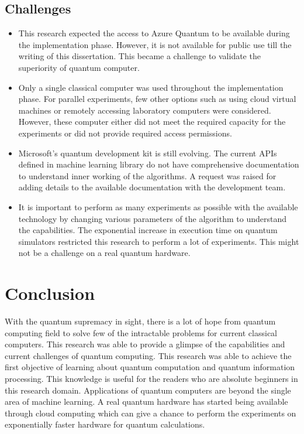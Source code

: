 \documentclass[english,a4paper,11pt,oneside,onecolumn]{book}
\begin{document}
\section{Challenges}
\begin{itemize}
    \item This research expected the access to Azure Quantum to be available during the implementation phase. However, it is not available for public use till the writing of this dissertation. 
    This became a challenge to validate the superiority of quantum computer.
    
    \item Only a single classical computer was used throughout the implementation phase. For parallel experiments, few other options such as using cloud virtual machines or remotely accessing laboratory computers were considered. However, these computer either did not meet the required capacity for the experiments or did not provide required access permissions.
    
    \item Microsoft's quantum development kit is still evolving. The current APIs defined in machine learning library do not have comprehensive documentation to understand inner working of the algorithms. A request was raised for adding details to the available documentation with the development team.
    
    \item It is important to perform as many experiments as possible with the available technology by changing various parameters of the algorithm to understand the capabilities. The exponential increase in execution time on quantum simulators restricted this research to perform a lot of experiments. This might not be a challenge on a real quantum hardware.
    
\end{itemize}

\chapter{Conclusion}
\label{sec:concl}
With the quantum supremacy in sight, there is a lot of hope from quantum computing field to solve few of the intractable problems for current classical computers. This research was able to provide a glimpse of the capabilities and current challenges of quantum computing. This research was able to achieve the first objective of learning about quantum computation and quantum information processing. This knowledge is useful for the readers who are absolute beginners in this research domain. Applications of quantum computers are beyond the single area of machine learning. A real quantum hardware has started being available through cloud computing which can give a chance to perform the experiments on exponentially faster hardware for quantum calculations.
\end{document}
